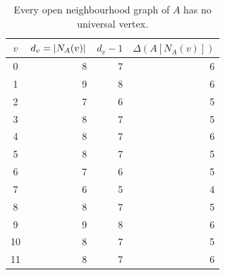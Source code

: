 \begin{table}[H]
\centering\small\setlength{\tabcolsep}{4pt}
\caption{Every open neighbourhood graph of \(A\) has no universal vertex.}\label{6k6:tab:Ano0}
\begin{tabular}{c r r r}
\toprule
$v$ & $d_v=\lvert N_A(v)\rvert$ & $d_v-1$ & $\Delta(A[N_A(v)])$\\
\midrule

0 & 8 & 7 & 6\\
1 & 9 & 8 & 6\\
2 & 7 & 6 & 5\\
3 & 8 & 7 & 5\\
4 & 8 & 7 & 6\\
5 & 8 & 7 & 5\\
6 & 7 & 6 & 5\\
7 & 6 & 5 & 4\\
8 & 8 & 7 & 5\\
9 & 9 & 8 & 6\\
10 & 8 & 7 & 5\\
11 & 8 & 7 & 6\\
\bottomrule
\end{tabular}
\end{table}
